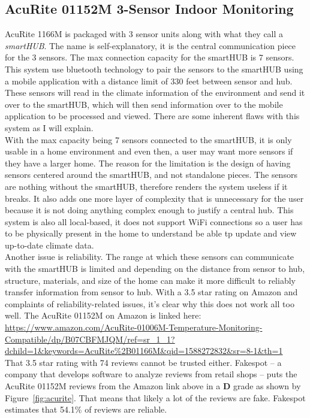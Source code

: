 \documentclass{article}
\begin{document}
\subsection{AcuRite 01152M 3-Sensor Indoor Monitoring}
AcuRite 1166M is packaged with 3 sensor units along with what they call a \textit{smartHUB}. The name is self-explanatory, it is the central communication piece for the 3 sensors. The max connection capacity for the smartHUB is 7 sensors. This system use bluetooth technology to pair the sensors to the smartHUB using a mobile application with a distance limit of 330 feet between sensor and hub. These sensors will read in the climate information of the environment and send it over to the smartHUB, which will then send information over to the mobile application to be processed and viewed. There are some inherent flaws with this system as I will explain.\\

With the max capacity being 7 sensors connected to the smartHUB, it is only usable in a home environment and even then, a user may want more sensors if they have a larger home. The reason for the limitation is the design of having sensors centered around the smartHUB, and not standalone pieces. The sensors are nothing without the smartHUB, therefore renders the system useless if it breaks. It also adds one more layer of complexity that is unnecessary for the user because it is not doing anything complex enough to justify a central hub. This system is also all local-based, it does not support WiFi connections so a user has to be physically present in the home to understand be able tp update and view up-to-date climate data.\\

Another issue is reliability. The range at which these sensors can communicate with the smartHUB is limited and depending on the distance from sensor to hub, structure, materials, and size of the home can make it more difficult to reliably transfer information from sensor to hub. With a 3.5 star rating on Amazon and complaints of reliability-related issues, it's clear why this does not work all too well. The AcuRite 01152M on Amazon is linked here:\\

\url{https://www.amazon.com/AcuRite-01006M-Temperature-Monitoring-Compatible/dp/B07CBFMJQM/ref=sr_1_1?dchild=1&keywords=AcuRite\%2B01166M&qid=1588272832&sr=8-1&th=1}\\

That 3.5 star rating with 74 reviews cannot be trusted either. Fakespot -- a company that develops software to analyze reviews from retail shops -- puts the AcuRite 01152M reviews from the Amazon link above in a \textbf{D} grade as shown by Figure~\ref{fig:acurite}. That means that likely a lot of the reviews are fake. Fakespot estimates that 54.1\% of reviews are reliable.\\
\end{document}
